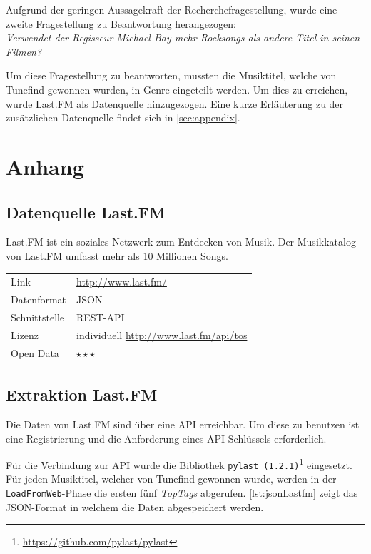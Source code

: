 \documentclass[parskip]{scrartcl}
\begin{document}
Aufgrund der geringen Aussagekraft der Recherchefragestellung, wurde eine zweite Fragestellung zu Beantwortung herangezogen:\\
\textit{Verwendet der Regisseur Michael Bay mehr Rocksongs als andere Titel in seinen Filmen?}

Um diese Fragestellung zu beantworten, mussten die Musiktitel, welche von Tunefind gewonnen wurden, in Genre eingeteilt werden. Um dies zu erreichen, wurde Last.FM als Datenquelle hinzugezogen. Eine kurze Erläuterung zu der zusätzlichen Datenquelle findet sich in \autoref{sec:appendix}.


\section{Anhang}
\label{sec:appendix}

\subsection{Datenquelle Last.FM}

Last.FM ist ein soziales Netzwerk zum Entdecken von Musik. Der Musikkatalog von Last.FM umfasst mehr als 10 Millionen Songs.

\begin{tabular}{l|p{9cm}}
    Link & \url{http://www.last.fm/} \\
    Datenformat & JSON \\
    Schnittstelle & REST-API \\
    Lizenz & individuell \href{http://www.last.fm/api/tos}{http://www.last.fm/api/tos} \\
    Open Data & $\star\star\star$ \\
\end{tabular}

\subsection{Extraktion Last.FM}

Die Daten von Last.FM sind über eine API erreichbar. Um diese zu benutzen ist eine Registrierung und die Anforderung eines API Schlüssels erforderlich.

Für die Verbindung zur API wurde die Bibliothek \texttt{pylast (1.2.1)}\footnote{\href{https://github.com/pylast/pylast}{https://github.com/pylast/pylast}} eingesetzt. Für jeden Musiktitel, welcher von Tunefind gewonnen wurde, werden in der \texttt{LoadFromWeb}-Phase die ersten fünf \textit{TopTags} abgerufen. \autoref{lst:jsonLastfm} zeigt das JSON-Format in welchem die Daten abgespeichert werden.
\end{document}
